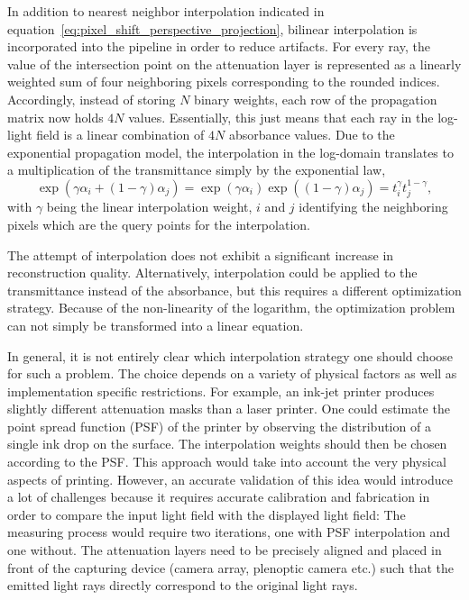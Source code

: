In addition to nearest neighbor interpolation indicated in equation~\ref{eq:pixel_shift_perspective_projection}, bilinear interpolation is incorporated into the pipeline in order to reduce artifacts.
For every ray, the value of the intersection point on the attenuation layer is represented as a linearly weighted sum of four neighboring pixels corresponding to the rounded indices.
Accordingly, instead of storing $N$ binary weights, each row of the propagation matrix now holds $4 N$ values.
Essentially, this just means that each ray in the log-light field is a linear combination of $4 N$ absorbance values.
Due to the exponential propagation model, the interpolation in the log-domain translates to a multiplication of the transmittance simply by the exponential law,
\begin{equation*}	
	\exp( \gamma \alpha_i + (1 - \gamma) \alpha_j ) = \exp( \gamma \alpha_i ) \exp( (1 - \gamma) \alpha_j ) = t_i^{\gamma} t_j^{1 - \gamma},
\end{equation*}
with $\gamma$ being the linear interpolation weight, $i$ and $j$ identifying the neighboring pixels which are the query points for the interpolation.

The attempt of interpolation does not exhibit a significant increase in reconstruction quality.
Alternatively, interpolation could be applied to the transmittance instead of the absorbance, but this requires a different optimization strategy.
Because of the non-linearity of the logarithm, the optimization problem can not simply be transformed into a linear equation.

In general, it is not entirely clear which interpolation strategy one should choose for such a problem.
The choice depends on a variety of physical factors as well as implementation specific restrictions.
For example, an ink-jet printer produces slightly different attenuation masks than a laser printer.
One could estimate the point spread function (PSF) of the printer by observing the distribution of a single ink drop on the surface.
The interpolation weights should then be chosen according to the PSF.
This approach would take into account the very physical aspects of printing.
However, an accurate validation of this idea would introduce a lot of challenges because it requires accurate calibration and fabrication in order to compare the input light field with the displayed light field:
The measuring process would require two iterations, one with PSF interpolation and one without.
The attenuation layers need to be precisely aligned and placed in front of the capturing device (camera array, plenoptic camera etc.) such that the emitted light rays directly correspond to the original light rays.

